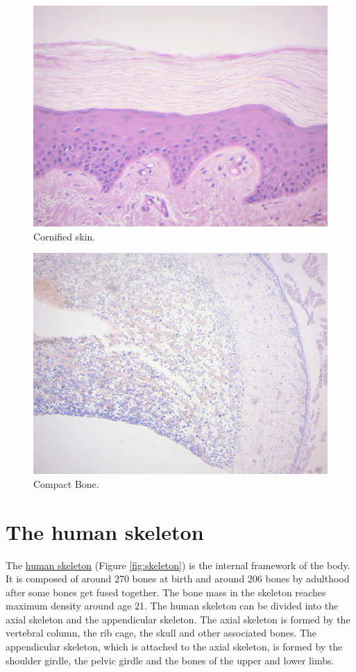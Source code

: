 \begin{figure}

{\centering \includegraphics[width=0.7\linewidth]{./figures/anatomy/cornified_skin}

}

\caption{Cornified skin.}\label{fig:cornified}
\end{figure}

\begin{figure}

{\centering \includegraphics[width=0.7\linewidth]{./figures/anatomy/compact_bone}

}

\caption{Compact Bone.}\label{fig:compactbone}
\end{figure}

\section{The human skeleton}\label{the-human-skeleton}

The \href{https://en.wikipedia.org/wiki/Human_skeleton}{human skeleton}
(Figure \ref{fig:skeleton}) is the internal framework of the body. It is
composed of around 270 bones at birth and around 206 bones by adulthood
after some bones get fused together. The bone mass in the skeleton
reaches maximum density around age 21. The human skeleton can be divided
into the axial skeleton and the appendicular skeleton. The axial
skeleton is formed by the vertebral column, the rib cage, the skull and
other associated bones. The appendicular skeleton, which is attached to
the axial skeleton, is formed by the shoulder girdle, the pelvic girdle
and the bones of the upper and lower limbs.

